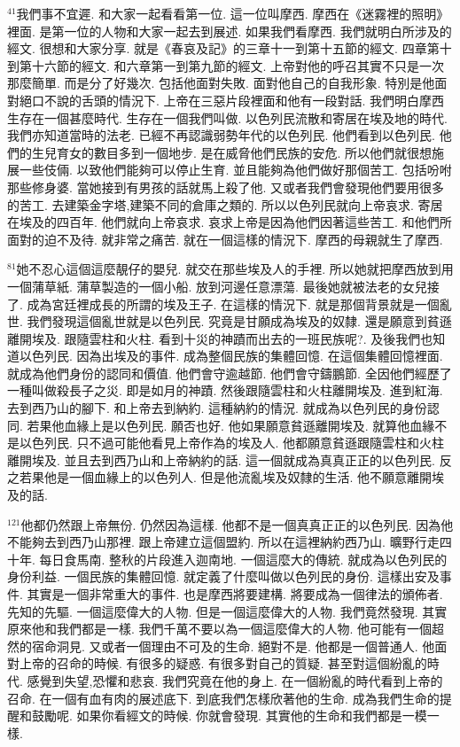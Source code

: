 \documentclass{book}
\begin{document}
$^{41}$我們事不宜遲.
和大家一起看看第一位.
這一位叫摩西.
摩西在《迷霧裡的照明》裡面.
是第一位的人物和大家一起去到展述.
如果我們看摩西.
我們就明白所涉及的經文.
很想和大家分享.
就是《春哀及記》的三章十一到第十五節的經文.
四章第十到第十六節的經文.
和六章第一到第九節的經文.
上帝對他的呼召其實不只是一次那麼簡單.
而是分了好幾次.
包括他面對失敗.
面對他自己的自我形象.
特別是他面對絕口不說的舌頭的情況下.
上帝在三惡片段裡面和他有一段對話.
我們明白摩西生存在一個甚麼時代.
生存在一個我們叫做.
以色列民流散和寄居在埃及地的時代.
我們亦知道當時的法老.
已經不再認識弱勢年代的以色列民.
他們看到以色列民.
他們的生兒育女的數目多到一個地步.
是在威脅他們民族的安危.
所以他們就很想施展一些伎倆.
以致他們能夠可以停止生育.
並且能夠為他們做好那個苦工.
包括吩咐那些修身婆.
當她接到有男孩的話就馬上殺了他.
又或者我們會發現他們要用很多的苦工.
去建築金字塔,建築不同的倉庫之類的.
所以以色列民就向上帝哀求.
寄居在埃及的四百年.
他們就向上帝哀求.
哀求上帝是因為他們因著這些苦工.
和他們所面對的迫不及待.
就非常之痛苦.
就在一個這樣的情況下.
摩西的母親就生了摩西.

$^{81}$她不忍心這個這麼靚仔的嬰兒.
就交在那些埃及人的手裡.
所以她就把摩西放到用一個蒲草紙.
蒲草製造的一個小船.
放到河邊任意漂蕩.
最後她就被法老的女兒接了.
成為宮廷裡成長的所謂的埃及王子.
在這樣的情況下.
就是那個背景就是一個亂世.
我們發現這個亂世就是以色列民.
究竟是甘願成為埃及的奴隸.
還是願意到貧遜離開埃及.
跟隨雲柱和火柱.
看到十災的神蹟而出去的一班民族呢?.
及後我們也知道以色列民.
因為出埃及的事件.
成為整個民族的集體回憶.
在這個集體回憶裡面.
就成為他們身份的認同和價值.
他們會守逾越節.
他們會守鑄鵬節.
全因他們經歷了一種叫做殺長子之災.
即是如月的神蹟.
然後跟隨雲柱和火柱離開埃及.
進到紅海.
去到西乃山的腳下.
和上帝去到納約.
這種納約的情況.
就成為以色列民的身份認同.
若果他血緣上是以色列民.
願否也好.
他如果願意貧遜離開埃及.
就算他血緣不是以色列民.
只不過可能他看見上帝作為的埃及人.
他都願意貧遜跟隨雲柱和火柱離開埃及.
並且去到西乃山和上帝納約的話.
這一個就成為真真正正的以色列民.
反之若果他是一個血緣上的以色列人.
但是他流亂埃及奴隸的生活.
他不願意離開埃及的話.

$^{121}$他都仍然跟上帝無份.
仍然因為這樣.
他都不是一個真真正正的以色列民.
因為他不能夠去到西乃山那裡.
跟上帝建立這個盟約.
所以在這裡納約西乃山.
曠野行走四十年.
每日食馬南.
整秋的片段進入迦南地.
一個這麼大的傳統.
就成為以色列民的身份利益.
一個民族的集體回憶.
就定義了什麼叫做以色列民的身份.
這樣出安及事件.
其實是一個非常重大的事件.
也是摩西將要建構.
將要成為一個律法的頒佈者.
先知的先驅.
一個這麼偉大的人物.
但是一個這麼偉大的人物.
我們竟然發現.
其實原來他和我們都是一樣.
我們千萬不要以為一個這麼偉大的人物.
他可能有一個超然的宿命洞見.
又或者一個理由不可及的生命.
絕對不是.
他都是一個普通人.
他面對上帝的召命的時候.
有很多的疑惑.
有很多對自己的質疑.
甚至對這個紛亂的時代.
感覺到失望,恐懼和悲哀.
我們究竟在他的身上.
在一個紛亂的時代看到上帝的召命.
在一個有血有肉的展述底下.
到底我們怎樣欣著他的生命.
成為我們生命的提醒和鼓勵呢.
如果你看經文的時候.
你就會發現.
其實他的生命和我們都是一模一樣.
\end{document}
